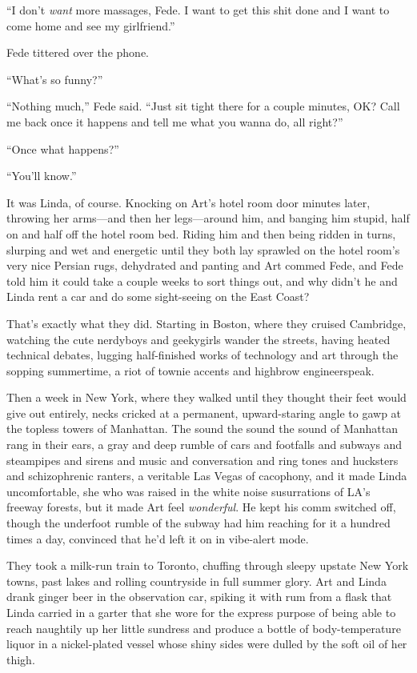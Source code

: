 “I don’t \emph{want} more massages, Fede. I want to get this shit
done and I want to come home and see my girlfriend.”

Fede tittered over the phone.

“What’s so funny?”

“Nothing much,” Fede said. “Just sit tight there for a couple
minutes, OK? Call me back once it happens and tell me what you
wanna do, all right?”

“Once what happens?”

“You’ll know.”

It was Linda, of course. Knocking on Art’s hotel room door minutes
later, throwing her arms—and then her legs—around him, and banging
him stupid, half on and half off the hotel room bed. Riding him and
then being ridden in turns, slurping and wet and energetic until
they both lay sprawled on the hotel room’s very nice Persian rugs,
dehydrated and panting and Art commed Fede, and Fede told him it
could take a couple weeks to sort things out, and why didn’t he and
Linda rent a car and do some sight-seeing on the East Coast?

That’s exactly what they did. Starting in Boston, where they
cruised Cambridge, watching the cute nerdyboys and geekygirls
wander the streets, having heated technical debates, lugging
half-finished works of technology and art through the sopping
summertime, a riot of townie accents and highbrow engineerspeak.

Then a week in New York, where they walked until they thought their
feet would give out entirely, necks cricked at a permanent,
upward-staring angle to gawp at the topless towers of Manhattan.
The sound the sound the sound of Manhattan rang in their ears, a
gray and deep rumble of cars and footfalls and subways and
steampipes and sirens and music and conversation and ring tones and
hucksters and schizophrenic ranters, a veritable Las Vegas of
cacophony, and it made Linda uncomfortable, she who was raised in
the white noise susurrations of LA’s freeway forests, but it made
Art feel \emph{wonderful}. He kept his comm switched off, though
the underfoot rumble of the subway had him reaching for it a
hundred times a day, convinced that he’d left it on in vibe-alert
mode.

They took a milk-run train to Toronto, chuffing through sleepy
upstate New York towns, past lakes and rolling countryside in full
summer glory. Art and Linda drank ginger beer in the observation
car, spiking it with rum from a flask that Linda carried in a
garter that she wore for the express purpose of being able to reach
naughtily up her little sundress and produce a bottle of
body-temperature liquor in a nickel-plated vessel whose shiny sides
were dulled by the soft oil of her thigh.

